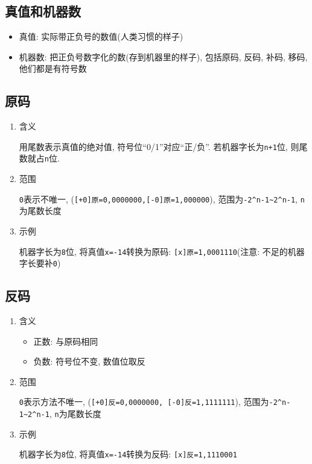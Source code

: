 \subsection{真值和机器数}
\begin{itemize}
\item 真值: 实际带正负号的数值(人类习惯的样子)
\item 机器数: 把正负号数字化的数(存到机器里的样子), 包括原码, 反码, 补码, 移码, 他们都是有符号数
\end{itemize}
\subsection{原码}
\begin{enumerate}
\item 含义 \par
用尾数表示真值的绝对值, 符号位``0/1''对应``正/负''. 若机器字长为\verb|n+1|位, 则尾数就占\verb|n|位.
\item 范围 \par
\verb|0|表示不唯一, (\verb|[+0]原=0,0000000,[-0]原=1,000000|), 范围为\verb|-2^n-1~2^n-1|, \verb|n|为尾数长度
\item 示例 \par
机器字长为\verb|8|位, 将真值\verb|x=-14|转换为原码: \verb|[x]原=1,0001110|(注意: 不足的机器字长要补\verb|0|)
\end{enumerate}
\subsection{反码}
\begin{enumerate}
\item 含义 \par
\begin{itemize}
\item 正数: 与原码相同
\item 负数: 符号位不变, 数值位取反
\end{itemize}
\item 范围 \par
\verb|0|表示方法不唯一, (\verb|[+0]反=0,0000000, [-0]反=1,1111111|), 范围为\verb|-2^n-1~2^n-1|, \verb|n|为尾数长度
\item 示例 \par
机器字长为\verb|8|位, 将真值\verb|x=-14|转换为反码: \verb|[x]反=1,1110001|
\end{enumerate}
